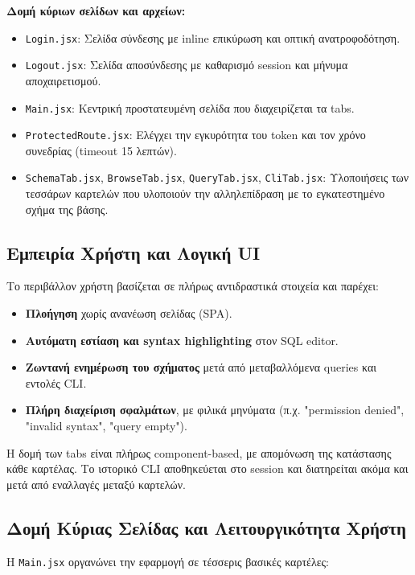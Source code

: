 \documentclass[13pt]{extarticle}
\begin{document}
\vspace{0.5em}
\textbf{Δομή κύριων σελίδων και αρχείων:}
\begin{itemize}
  \item \texttt{Login.jsx}: Σελίδα σύνδεσης με inline επικύρωση και οπτική ανατροφοδότηση.
  \item \texttt{Logout.jsx}: Σελίδα αποσύνδεσης με καθαρισμό session και μήνυμα αποχαιρετισμού.
  \item \texttt{Main.jsx}: Κεντρική προστατευμένη σελίδα που διαχειρίζεται τα tabs.
  \item \texttt{ProtectedRoute.jsx}: Ελέγχει την εγκυρότητα του token και τον χρόνο συνεδρίας (timeout 15 λεπτών).
  \item \texttt{SchemaTab.jsx}, \texttt{BrowseTab.jsx}, \texttt{QueryTab.jsx}, \texttt{CliTab.jsx}: Υλοποιήσεις των τεσσάρων καρτελών που υλοποιούν την αλληλεπίδραση με το εγκατεστημένο σχήμα της βάσης.
\end{itemize}

\subsection{Εμπειρία Χρήστη και Λογική UI}

Το περιβάλλον χρήστη βασίζεται σε πλήρως αντιδραστικά στοιχεία και παρέχει:

\begin{itemize}
    \item \textbf{Πλοήγηση} χωρίς ανανέωση σελίδας (SPA).
    \item \textbf{Αυτόματη εστίαση και syntax highlighting} στον SQL editor.
    \item \textbf{Ζωντανή ενημέρωση του σχήματος} μετά από μεταβαλλόμενα queries και εντολές CLI.
    \item \textbf{Πλήρη διαχείριση σφαλμάτων}, με φιλικά μηνύματα (π.χ. "permission denied", "invalid syntax", "query empty").
\end{itemize}

Η δομή των tabs είναι πλήρως component-based, με απομόνωση της κατάστασης κάθε καρτέλας. Το ιστορικό CLI αποθηκεύεται στο session και διατηρείται ακόμα και μετά από εναλλαγές μεταξύ καρτελών.

\subsection{Δομή Κύριας Σελίδας και Λειτουργικότητα Χρήστη}

Η \texttt{Main.jsx} οργανώνει την εφαρμογή σε τέσσερις βασικές καρτέλες:
\end{document}
